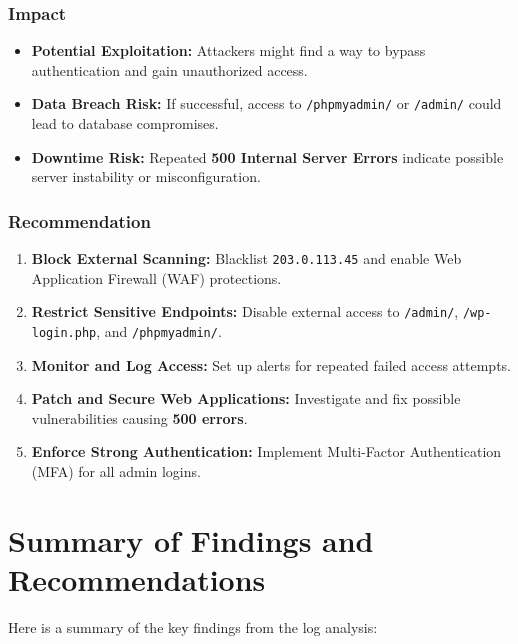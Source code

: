 \documentclass[11pt]{article}
\begin{document}
\subsubsection{Impact}
\begin{itemize}
    \item \textbf{Potential Exploitation:} Attackers might find a way to bypass authentication and gain unauthorized access.
    \item \textbf{Data Breach Risk:} If successful, access to \texttt{/phpmyadmin/} or \texttt{/admin/} could lead to database compromises.
    \item \textbf{Downtime Risk:} Repeated \textbf{500 Internal Server Errors} indicate possible server instability or misconfiguration.
\end{itemize}

\subsubsection{Recommendation}
\begin{enumerate}
    \item \textbf{Block External Scanning:} Blacklist \texttt{203.0.113.45} and enable Web Application Firewall (WAF) protections.
    \item \textbf{Restrict Sensitive Endpoints:} Disable external access to \texttt{/admin/}, \texttt{/wp-login.php}, and \texttt{/phpmyadmin/}.
    \item \textbf{Monitor and Log Access:} Set up alerts for repeated failed access attempts.
    \item \textbf{Patch and Secure Web Applications:} Investigate and fix possible vulnerabilities causing \textbf{500 errors}.
    \item \textbf{Enforce Strong Authentication:} Implement Multi-Factor Authentication (MFA) for all admin logins.
\end{enumerate}

\clearpage
\section{Summary of Findings and Recommendations}
Here is a summary of the key findings from the log analysis:
\end{document}

